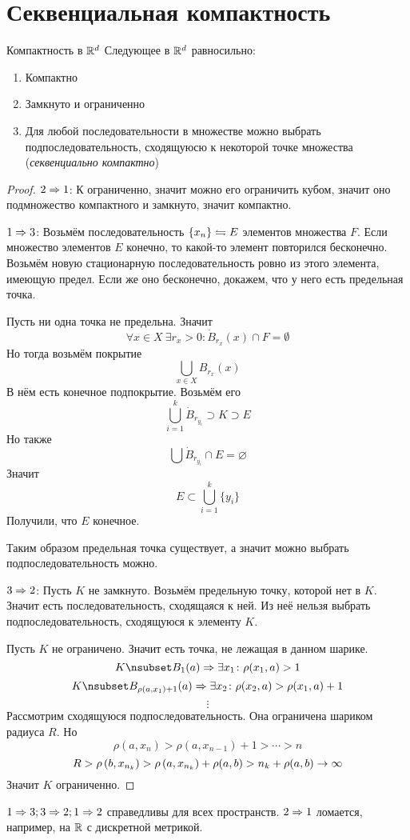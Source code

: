 \section{Секвенциальная компактность}

\begin{theorem}{Компактность в $\mathbb{R}^d$}
Следующее в $\mathbb{R}^d$ равносильно:
\begin{enumerate}
\item Компактно
\item Замкнуто и ограниченно
\item Для любой последовательности в множестве можно выбрать подпоследовательность, сходящуюсю к некоторой точке множества (\textit{секвенциально компактно})
\end{enumerate}
\end{theorem}
\begin{proof}
$2 \Rightarrow 1$: $К$ ограниченно, значит можно его ограничить кубом, значит оно подмножество компактного и замкнуто, значит компактно.

$1 \Rightarrow 3$:
Возьмём последовательность $\{x_n\}\leftrightharpoons E$ элементов множества $F$. Если множество элементов $E$ конечно, то какой-то элемент повторился бесконечно. Возьмём новую стационарную последовательность ровно из этого элемента, имеющую предел. Если же оно бесконечно, докажем, что у него есть предельная точка.

Пусть ни одна точка не предельна. Значит 
$$\forall x \in X\: \exists r_x > 0\colon \dot B_{r_x}(x) \cap F = \emptyset$$
Но тогда возьмём покрытие
$$\bigcup_{x\in X} B_{r_x} (x)$$
В нём есть конечное подпокрытие. Возьмём его
$$\bigcup_{i=1}^k \dot B_{r_{y_i}} \supset K \supset E$$
Но также
$$\bigcup \dot B_{r_{y_i}} \cap E = \varnothing$$
Значит 
$$E \subset \bigcup_{i=1}^k \{y_i\}$$
Получили, что $E$ конечное. 

Таким образом предельная точка существует, а значит можно выбрать подпоследовательность можно.

$3 \Rightarrow 2$:
Пусть $K$ не замкнуто. Возьмём предельную точку, которой нет в $K$. Значит есть последовательность, сходящаяся к ней. Из неё нельзя выбрать подпоследовательность, сходящуюся к элементу $K$.

Пусть $K$ не ограничено. Значит есть точка, не лежащая в данном шарике.
$$K \nsubset B_1(a) \Ra \exists x_1\colon \rho(x_1, a) > 1$$
$$K \nsubset B_{\rho(a, x_1) + 1}(a) \Ra \exists x_2\colon \rho(x_2, a) > \rho(x_1, a) + 1$$
$$ \vdots $$
Рассмотрим сходящуюся подпоследовательность. Она ограничена шариком радиуса $R$. Но
$$\rho(a, x_n) > \rho(a, x_{n-1}) + 1 > \cdots > n$$
$$R > \rho\left(b, x_{n_k}\right) > \rho\left(a, x_{n_k}\right) + \rho(a, b) > n_k + \rho(a, b) \rightarrow \infty$$
Значит $K$ ограниченно.  
\end{proof}

\begin{Rem}
$1\Rightarrow 3; 3\Rightarrow 2; 1 \Rightarrow 2$ справедливы для всех пространств. $2 \Rightarrow 1$ ломается, например, на $\mathbb{R}$ с дискретной метрикой.
\end{Rem}
